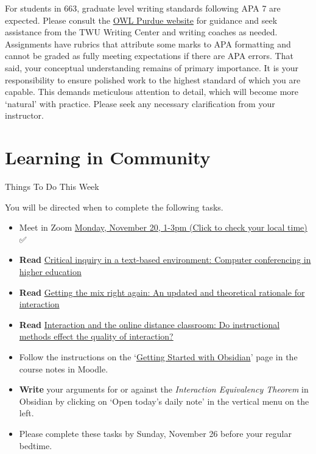 \documentclass[
]{book}
\providecommand{\tightlist}{%
  \setlength{\itemsep}{0pt}\setlength{\parskip}{0pt}}
\begin{document}
For students in 663, graduate level writing standards following APA 7 are expected. Please consult the \href{https://owl.purdue.edu/owl/research_and_citation/apa_style/apa_style_introduction.html}{OWL Purdue website} for guidance and seek assistance from the TWU Writing Center and writing coaches as needed. Assignments have rubrics that attribute some marks to APA formatting and cannot be graded as fully meeting expectations if there are APA errors. That said, your conceptual understanding remains of primary importance. It is your responsibility to ensure polished work to the highest standard of which you are capable. This demands meticulous attention to detail, which will become more `natural' with practice. Please seek any necessary clarification from your instructor.

\hypertarget{learning-in-community}{%
\chapter{Learning in Community}\label{learning-in-community}}

\begin{feedback}
{Things To Do This Week}

You will be directed when to complete the following tasks.

\begin{itemize}
\tightlist
\item
  Meet in Zoom \href{https://www.timeanddate.com/worldclock/fixedtime.html?msg=LDRS+663\&iso=20231120T13\&p1=1109\&ah=2}{{Monday, November 20, 1-3pm }(Click to check your local time)} ✅
\item
  \textbf{Read} \href{https://www-sciencedirect-com.twu.idm.oclc.org/science/article/pii/S1096751600000166}{Critical inquiry in a text-based environment: Computer conferencing in higher education}\\
\item
  \textbf{Read} \href{http://www.irrodl.org/index.php/irrodl/article/view/149/230}{Getting the mix right again: An updated and theoretical rationale for interaction}\\
\item
  \textbf{Read} \href{https://link-springer-com.ezproxy.student.twu.ca/article/10.1007/s12528-011-9049-4}{Interaction and the online distance classroom: Do instructional methods effect the quality of interaction?}\\
\item
  Follow the instructions on the `\href{https://ma-lead.github.io/ldrs663/getting-started-with-obsidian.html}{Getting Started with Obsidian}' page in the course notes in Moodle.
\item
  \textbf{Write} your arguments for or against the \emph{Interaction Equivalency Theorem} in Obsidian by clicking on `Open today's daily note' in the vertical menu on the left.\\
\item
  Please complete these tasks by {Sunday, November 26} before your regular bedtime.
\end{itemize}
\end{feedback}
\end{document}
